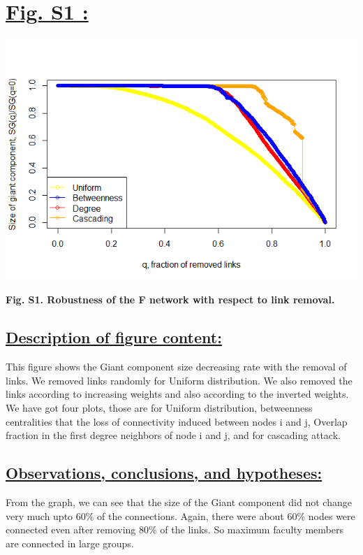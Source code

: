\documentclass{article}\usepackage[]{graphicx}\usepackage[]{color}
\begin{document}
\newpage
\section*{\underline{Fig. S1 :}}
\begin{center}
\includegraphics[scale=0.8]{S1.png}
\newline
\par{\textbf{Fig. S1. Robustness of the F network with respect to link removal.}}
\end{center}
\subsection*{\underline{Description of figure content:}}
\par{This figure shows the Giant component size decreasing rate with the removal of links. We removed links randomly for Uniform distribution. We also removed the links according to increasing weights and also according to the inverted weights. We have got four plots, those are for Uniform distribution, betweenness centralities that the loss of connectivity induced between nodes i and j, Overlap fraction in the first degree neighbors of node i and j, and for cascading attack.}
\subsection*{\underline{Observations, conclusions, and hypotheses:}}
\par{From the graph, we can see that the size of the Giant component did not change very much upto 60\% of the connections. Again, there were about 60\% nodes were connected even after removing 80\% of the links. So maximum faculty members are connected in large groups.}
\end{document}
